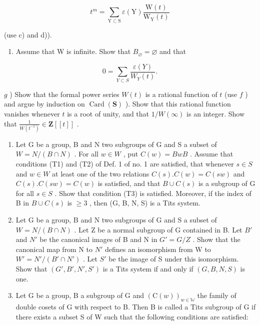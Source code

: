 \[
t ^ {m} = \sum_ {\mathrm{Y} \subset \mathrm{S}} \varepsilon (\mathrm{Y}) \frac {\mathrm{W} (t)}{\mathrm{W} _ {\mathrm{Y}} (t)}
\]

(use c) and d)).

\begin{enumerate}
\def\labelenumi{\alph{enumi})}
\setcounter{enumi}{5}
\tightlist
\item
  Assume that W is infinite. Show that \(B_{\varnothing} = \varnothing\) and that
\end{enumerate}

\[
0 = \sum_ {Y \subset S} \frac {\varepsilon (Y)}{W _ {Y} (t)}.
\]

\(g\) ) Show that the formal power series \(W(t)\) is a rational function of \(t\) (use \(f\) ) and argue by induction on \(\operatorname{Card}(\mathbf{S})\) ). Show that this rational function vanishes whenever \(t\) is a root of unity, and that \(1 / W(\infty)\) is an integer. Show that \(\frac{1}{W(t^{-1})} \in \mathbf{Z}[[t]]\) .


\begin{enumerate}
\def\labelenumi{\arabic{enumi})}
\item
  Let G be a group, B and N two subgroups of G and S a subset of \(W = N/(B \cap N)\) . For all \(w \in W\) , put \(C(w) = BwB\) . Assume that conditions (T1) and (T2) of Def. 1 of no. 1 are satisfied, that whenever \(s \in S\) and \(w \in W\) at least one of the two relations \(C(s).C(w) = C(sw)\) and \(C(s).C(sw) = C(w)\) is satisfied, and that \(B \cup C(s)\) is a subgroup of G for all \(s \in S\) . Show that condition (T3) is satisfied. Moreover, if the index of B in \(B \cup C(s)\) is \(\geqslant 3\) , then (G, B, N, S) is a Tits system.
\item
  Let G be a group, B and N two subgroups of G and S a subset of \(W = N/(B \cap N)\) . Let Z be a normal subgroup of G contained in B. Let \(B'\) and \(N'\) be the canonical images of B and N in \(G' = G/Z\) . Show that the canonical map from N to \(N'\) defines an isomorphism from W to \(W' = N'/(B' \cap N')\) . Let \(S'\) be the image of S under this isomorphism. Show that \((G', B', N', S')\) is a Tits system if and only if \((G, B, N, S)\) is one.
\item
  Let G be a group, B a subgroup of G and \((\mathrm{C}(w))_{w\in\mathbb{W}}\) the family of double cosets of G with respect to B. Then B is called a Tits subgroup of G if there exists a subset S of W such that the following conditions are satisfied:
\end{enumerate}

